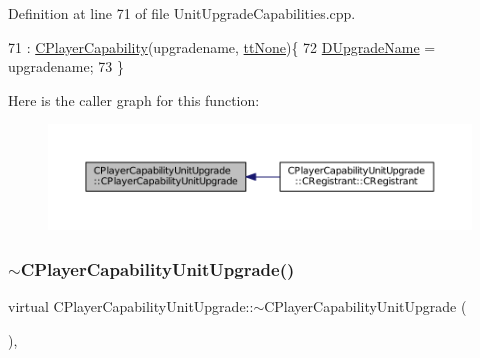 Definition at line 71 of file Unit\+Upgrade\+Capabilities.\+cpp.


\begin{DoxyCode}
71                                                                                        : 
      \hyperlink{classCPlayerCapability_a303de62aba5d3f65d9a8e013c64a96c1}{CPlayerCapability}(upgradename, \hyperlink{classCPlayerCapability_a9d3450ed1532fd536bd6cbb1e2eef02fac78f0e806a6b0ead030d63c27c9ce929}{ttNone})\{
72     \hyperlink{classCPlayerCapabilityUnitUpgrade_a5de8bffd6935c699f431329ad4ee5eec}{DUpgradeName} = upgradename;
73 \}
\end{DoxyCode}
Here is the caller graph for this function\+:
\nopagebreak
\begin{figure}[H]
\begin{center}
\leavevmode
\includegraphics[width=350pt]{classCPlayerCapabilityUnitUpgrade_ac87129322f9f31cc271ee3de33502c56_icgraph}
\end{center}
\end{figure}
\hypertarget{classCPlayerCapabilityUnitUpgrade_a7784e1fb92a26acb700c06ab38d2733b}{}\label{classCPlayerCapabilityUnitUpgrade_a7784e1fb92a26acb700c06ab38d2733b} 
\subsubsection{\texorpdfstring{$\sim$\+C\+Player\+Capability\+Unit\+Upgrade()}{~CPlayerCapabilityUnitUpgrade()}}
{\footnotesize\ttfamily virtual C\+Player\+Capability\+Unit\+Upgrade\+::$\sim$\+C\+Player\+Capability\+Unit\+Upgrade (\begin{DoxyParamCaption}{ }\end{DoxyParamCaption})\hspace{0.3cm}{\ttfamily [inline]}, {\ttfamily [virtual]}}



